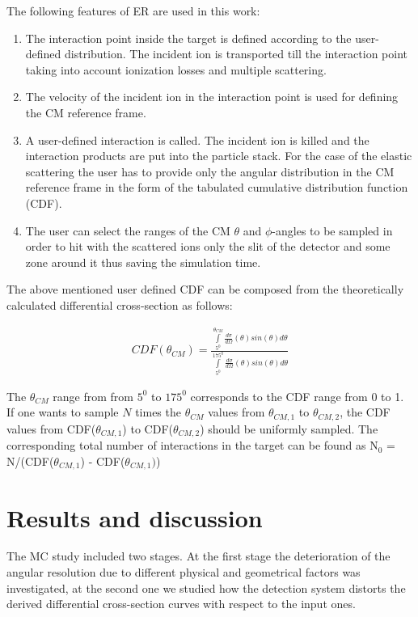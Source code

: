 \documentclass[%
 aip,
cp,  %
 amsmath,amssymb,%
 reprint,%
]{revtex4-2}
\begin{document}
The following features of ER are used in this work:
\begin{enumerate}
\item The interaction point inside the target is defined according to the user-defined distribution. The incident ion is transported till the interaction point taking into account ionization losses and multiple scattering.
\item The velocity of the incident ion in the interaction point is used for defining the CM reference frame.
\item A user-defined interaction is called. The incident ion is killed and the interaction products are put into the particle stack. For the case of the elastic scattering the user has to provide only the angular distribution in the CM reference frame in the form of the tabulated cumulative distribution function (CDF).
\item The user can select the ranges of the CM $\theta$ and $\phi$-angles to be sampled in order to hit with the scattered ions only the slit of the detector and some zone around it thus saving the simulation time.
\end{enumerate}

The above mentioned user defined CDF can be composed from the theoretically calculated differential cross-section as follows:

\begin{eqnarray}
 CDF(\theta_{CM}) = \frac{ \int\limits_{5^0}^{\theta_{CM}} \frac{d\sigma}{d\Omega}(\theta) sin(\theta)d\theta } { \int\limits_{5^0}^{175^0} \frac{d\sigma}{d\Omega}(\theta) sin(\theta)d\theta }
\end{eqnarray}

The $\theta_{CM}$ range from from $5 ^0$ to $175 ^0$ corresponds to the CDF range from 0 to 1.  If one wants to sample $N$ times the $\theta_{CM}$ values from $\theta_{CM, 1}$ to $\theta_{CM, 2}$, the CDF values from CDF($\theta_{CM, 1}$) to CDF($\theta_{CM, 2}$) should be uniformly sampled.  The corresponding total  number of interactions in the target can be found as N$_0$ = N/(CDF($\theta_{CM, 1}$) - CDF($\theta_{CM, 1})$)




\section{Results and discussion}

The MC study included two stages. At the first stage the deterioration of the angular resolution due to different physical and geometrical factors  was investigated, at the second one we studied how the detection system distorts the derived differential cross-section curves with respect to the input ones.
\end{document}

